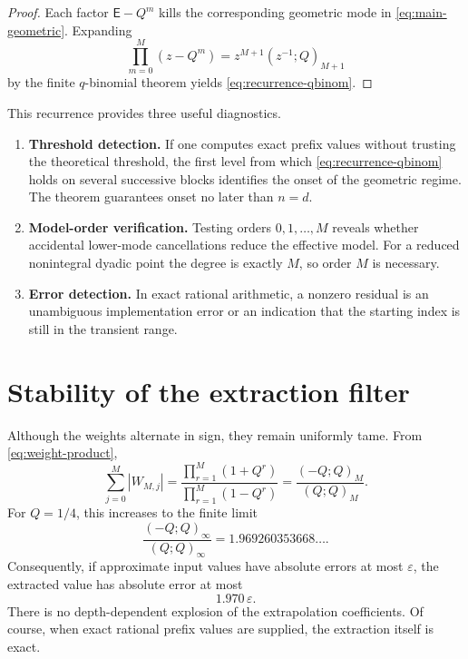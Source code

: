 \documentclass[11pt]{article}
\newcommand{\Shift}{\mathsf{E}}
\begin{document}
\begin{proof}
Each factor \(\Shift-Q^m\) kills the corresponding geometric mode in
\cref{eq:main-geometric}.  Expanding
\[
 \prod_{m=0}^{M}(z-Q^m)=z^{M+1}(z^{-1};Q)_{M+1}
\]
by the finite \(q\)-binomial theorem yields \cref{eq:recurrence-qbinom}.
\end{proof}

This recurrence provides three useful diagnostics.
\begin{enumerate}[leftmargin=2.2em]
\item \textbf{Threshold detection.}  If one computes exact prefix values
      without trusting the theoretical threshold, the first level from which
      \cref{eq:recurrence-qbinom} holds on several successive blocks identifies
      the onset of the geometric regime.  The theorem guarantees onset no later
      than \(n=d\).
\item \textbf{Model-order verification.}  Testing orders
      \(0,1,\ldots,M\) reveals whether accidental lower-mode cancellations
      reduce the effective model.  For a reduced nonintegral dyadic point the
      degree is exactly \(M\), so order \(M\) is necessary.
\item \textbf{Error detection.}  In exact rational arithmetic, a nonzero
      residual is an unambiguous implementation error or an indication that
      the starting index is still in the transient range.
\end{enumerate}

\section{Stability of the extraction filter}

Although the weights alternate in sign, they remain uniformly tame.  From
\cref{eq:weight-product},
\begin{equation}\label{eq:weight-norm}
 \sum_{j=0}^{M}|W_{M,j}|
 =\frac{\prod_{r=1}^{M}(1+Q^r)}{\prod_{r=1}^{M}(1-Q^r)}
 =\frac{(-Q;Q)_M}{(Q;Q)_M}.
\end{equation}
For \(Q=1/4\), this increases to the finite limit
\begin{equation}\label{eq:weight-limit}
 \frac{(-Q;Q)_\infty}{(Q;Q)_\infty}
 =1.969260353668\ldots.
\end{equation}
Consequently, if approximate input values have absolute errors at most
\(\varepsilon\), the extracted value has absolute error at most
\[
 1.970\,\varepsilon.
\]
There is no depth-dependent explosion of the extrapolation coefficients.  Of
course, when exact rational prefix values are supplied, the extraction itself
is exact.
\end{document}
